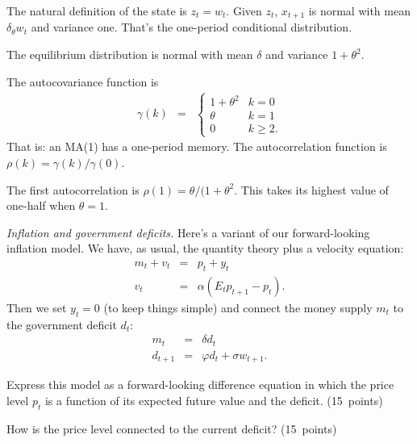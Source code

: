 \documentclass[11pt]{exam}
\begin{document}
\begin{questions}
\begin{solution}
\begin{parts}
\item The natural definition of the state is $z_t = w_t$.
Given $z_t$, $x_{t+1}$ is normal with mean $\delta _ \theta w_t$
and variance one.
That's the one-period conditional distribution.
\item The equilibrium distribution is normal with mean $\delta$
and variance $1 + \theta^2$.
\item The autocovariance function is
\begin{eqnarray*}
    \gamma(k) &=& \left\{
                \begin{array}{ll}
                1 + \theta^2    & k=0 \\
                \theta          & k=1 \\
                0               & k\geq 2 .
                \end{array}
                \right.
\end{eqnarray*}
That is:  an MA(1) has a one-period memory.
The autocorrelation function is $\rho(k) = \gamma(k)/\gamma(0)$.
\item The first autocorrelation is
$\rho(1) = \theta/(1+\theta^2$.
This takes its highest value of one-half when $\theta = 1$.
\end{parts}
\end{solution}

\item  {\it Inflation and government deficits.\/}
Here's a variant of our forward-looking inflation model.
We have, as usual, the quantity theory plus a velocity equation:
\begin{eqnarray*}
    m_t + v_t &=& p_t + y_t \\
    v_t &=& \alpha \left( E_t p_{t+1} - p_t \right) .
\end{eqnarray*}
Then we set $y_t = 0$ (to keep things simple) and connect the money supply $m_t$
to the government deficit $d_t$:
\begin{eqnarray*}
        m_{t} &=& \delta d_t \\
        d_{t+1} &=& \varphi d_t + \sigma w_{t+1} .
\end{eqnarray*}
%
\begin{parts}
\item Express this model as a forward-looking difference equation in
which the price level $p_t$ is a function of its expected future value
and the deficit.
(15~points)
\item How is the price level connected to the current deficit?
(15~points)
\end{parts}


\end{questions}
\end{document}
